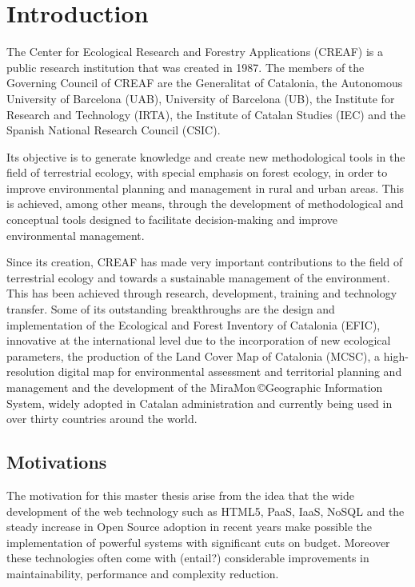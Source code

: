 \chapter{Introduction}

The Center for Ecological Research and Forestry Applications (CREAF) is a public research institution that was created in 1987.  The members of the Governing Council of CREAF are the Generalitat of Catalonia, the Autonomous University of Barcelona (UAB), University of Barcelona (UB), the Institute for Research and Technology (IRTA), the Institute of Catalan Studies (IEC) and the Spanish National Research Council (CSIC).

Its objective is to generate knowledge and create new methodological tools in the field of terrestrial ecology, with special emphasis on forest ecology, in order to improve environmental planning and management in rural and urban areas. This is achieved, among other means, through the development of methodological and conceptual tools designed to facilitate decision-making and improve environmental management.

Since its creation, CREAF has made very important contributions to the field of terrestrial ecology and towards a sustainable management of the environment. This has been achieved through research, development, training and technology transfer. Some of its outstanding breakthroughs are the design and implementation of the Ecological and Forest Inventory of Catalonia (EFIC), innovative at the international level due to the incorporation of new ecological parameters, the production of the Land Cover Map of Catalonia (MCSC), a high-resolution digital map for environmental assessment and territorial planning and management and the development of the MiraMon \copyright Geographic Information System, widely adopted in Catalan administration and currently being used in over thirty countries around the world.


\section{Motivations}

The motivation for this master thesis arise from the idea that the wide development of the web technology such as HTML5, PaaS, IaaS, NoSQL and the steady increase in Open Source adoption in recent years make possible the implementation of powerful systems with significant cuts on budget. Moreover these technologies often come with (entail?) considerable improvements in maintainability, performance and complexity reduction.

